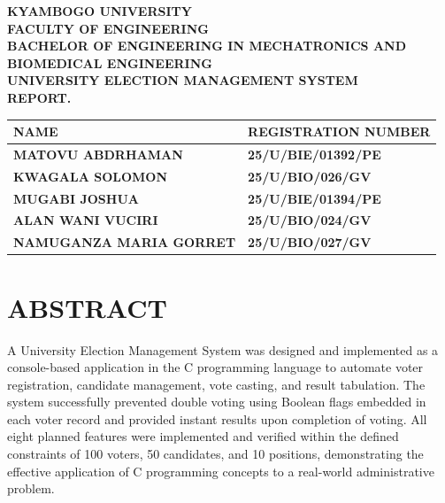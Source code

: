 \documentclass[12pt,a4paper]{article}
\begin{document}
\begin{titlepage}
  \centering
  \vspace*{1.5cm}

  {\large\bfseries KYAMBOGO UNIVERSITY}\\[0.4cm]
  {\normalsize\bfseries FACULTY OF ENGINEERING}\\[0.4cm]
  {\normalsize\bfseries BACHELOR OF ENGINEERING IN MECHATRONICS AND BIOMEDICAL ENGINEERING}\\[0.4cm]
  {\normalsize\bfseries UNIVERSITY ELECTION MANAGEMENT SYSTEM}\\[0.2cm]
  {\normalsize\bfseries REPORT.}\\[1.2cm]

  \begin{tabular}{|>{\centering\arraybackslash\bfseries}p{6cm}|>{\centering\arraybackslash\bfseries}p{6cm}|}
    \hline
    NAME & REGISTRATION NUMBER \\
    \hline
    MATOVU ABDRHAMAN & 25/U/BIE/01392/PE \\
    \hline
    KWAGALA SOLOMON & 25/U/BIO/026/GV \\
    \hline
    MUGABI JOSHUA & 25/U/BIE/01394/PE \\
    \hline
    ALAN WANI VUCIRI & 25/U/BIO/024/GV \\
    \hline
    NAMUGANZA MARIA GORRET & 25/U/BIO/027/GV \\
    \hline
  \end{tabular}

\end{titlepage}

\newpage
\section{ABSTRACT}

A University Election Management System was designed and implemented as a
console-based application in the C programming language to automate voter
registration, candidate management, vote casting, and result tabulation. The system
successfully prevented double voting using Boolean flags embedded in each voter
record and provided instant results upon completion of voting. All eight planned
features were implemented and verified within the defined constraints of 100 voters,
50 candidates, and 10 positions, demonstrating the effective application of C
programming concepts to a real-world administrative problem.
\end{document}
